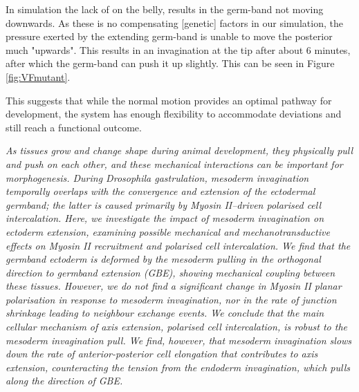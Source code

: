 In simulation the lack of  on the belly, results in the germ-band not moving downwards. As these is no compensating [genetic] factors in our simulation, the pressure exerted by the extending germ-band  is unable to move the posterior much "upwards". This results in an invagination at the tip after about 6 minutes, after which the germ-band can push it up slightly. This can be seen in Figure \ref{fig:VFmutant}.\\


This suggests that while the normal motion provides an optimal pathway for development, the system has enough flexibility to accommodate deviations and still reach a functional outcome.



\textit{As tissues grow and change shape during animal development, they physically pull and push on each other, and these mechanical interactions can be important for morphogenesis. During Drosophila gastrulation, mesoderm invagination temporally overlaps with the convergence and extension of the ectodermal germband; the latter is caused primarily by Myosin II–driven polarised cell intercalation. Here, we investigate the impact of mesoderm invagination on ectoderm extension, examining possible mechanical and mechanotransductive effects on Myosin II recruitment and polarised cell intercalation. We find that the germband ectoderm is deformed by the mesoderm pulling in the orthogonal direction to germband extension (GBE), showing mechanical coupling between these tissues. However, we do not find a significant change in Myosin II planar polarisation in response to mesoderm invagination, nor in the rate of junction shrinkage leading to neighbour exchange events. We conclude that the main cellular mechanism of axis extension, polarised cell intercalation, is robust to the mesoderm invagination pull. We find, however, that mesoderm invagination slows down the rate of anterior-posterior cell elongation that contributes to axis extension, counteracting the tension from the endoderm invagination, which pulls along the direction of GBE.}




